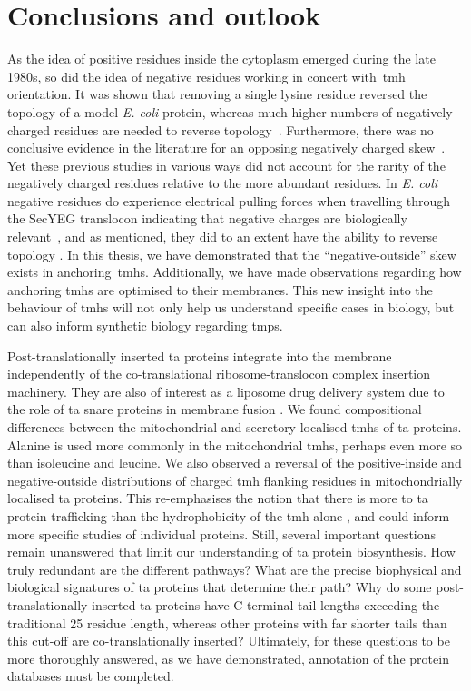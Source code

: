 \chapter{Conclusions and outlook}

\sloppy
As the idea of positive residues inside the cytoplasm emerged during the late 1980s, so did the idea of negative residues working in concert with~\gls{tmh} orientation.
It was shown that removing a single lysine residue reversed the topology of a model \textit{E. coli} protein, whereas much higher numbers of negatively charged residues are needed to reverse topology~\cite{Nilsson1990}.
Furthermore, there was no conclusive evidence in the literature for an opposing negatively charged skew~\cite{Granseth2005, Nilsson2005a, Sharpe2010, Baeza-Delgado2013, Pogozheva2013}.
Yet these previous studies in various ways did not account for the rarity of the negatively charged residues relative to the more abundant residues.
In \textit{E. coli} negative residues do experience electrical pulling forces when travelling through the SecYEG translocon indicating that negative charges are biologically relevant~\cite{Ismail2015}, and as mentioned, they did to an extent have the ability to reverse topology \cite{Nilsson1990}.
In this thesis, we have demonstrated that the ``negative\--outside'' skew exists in anchoring~\gls{tmh}s.
Additionally, we have made observations regarding how anchoring \gls{tmh}s are optimised to their membranes.
This new insight into the behaviour of \gls{tmh}s will not only help us understand specific cases in biology, but can also inform synthetic biology regarding \gls{tmp}s.

Post\--translationally inserted \gls{ta} proteins integrate into the membrane independently of the co\--translational ribosome\--translocon complex insertion machinery.
They are also of interest as a liposome drug delivery system due to the role of \gls{ta} \gls{snare} proteins in membrane fusion \cite{Ungar2003, Allen2013, Nordlund2014}.
We found compositional differences between the mitochondrial and secretory localised \gls{tmh}s of \gls{ta} proteins.
Alanine is used more commonly in the mitochondrial \gls{tmh}s, perhaps even more so than isoleucine and leucine.
We also observed a reversal of the positive\--inside and negative\--outside distributions of charged \gls{tmh} flanking residues in mitochondrially localised \gls{ta} proteins.
This re\--emphasises the notion that there is more to \gls{ta} protein trafficking than the hydrophobicity of the \gls{tmh} alone \cite{Guna2018}, and could inform more specific studies of individual proteins.
Still, several important questions remain unanswered that limit our understanding of \gls{ta} protein biosynthesis.
How truly redundant are the different pathways?
What are the precise biophysical and biological signatures of \gls{ta} proteins that determine their path?
Why do some post-translationally inserted \gls{ta} proteins have C-terminal tail lengths exceeding the traditional 25 residue length, whereas other proteins with far shorter tails than this cut-off are co-translationally inserted?
Ultimately, for these questions to be more thoroughly answered, as we have demonstrated, annotation of the protein databases must be completed.

